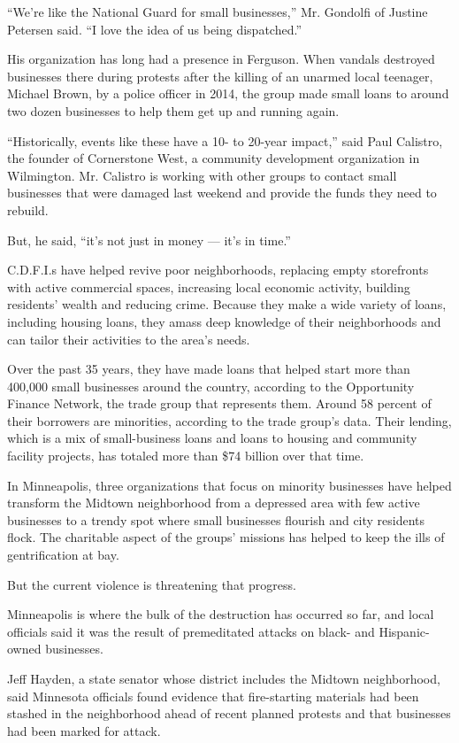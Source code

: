 ``We're like the National Guard for small businesses,'' Mr. Gondolfi of
Justine Petersen said. ``I love the idea of us being dispatched.''

His organization has long had a presence in Ferguson. When vandals
destroyed businesses there during protests after the killing of an
unarmed local teenager, Michael Brown, by a police officer in 2014, the
group made small loans to around two dozen businesses to help them get
up and running again.

``Historically, events like these have a 10- to 20-year impact,'' said
Paul Calistro, the founder of Cornerstone West, a community development
organization in Wilmington. Mr. Calistro is working with other groups to
contact small businesses that were damaged last weekend and provide the
funds they need to rebuild.

But, he said, ``it's not just in money --- it's in time.''

C.D.F.I.s have helped revive poor neighborhoods, replacing empty
storefronts with active commercial spaces, increasing local economic
activity, building residents' wealth and reducing crime. Because they
make a wide variety of loans, including housing loans, they amass deep
knowledge of their neighborhoods and can tailor their activities to the
area's needs.

Over the past 35 years, they have made loans that helped start more than
400,000 small businesses around the country, according to the
Opportunity Finance Network, the trade group that represents them.
Around 58 percent of their borrowers are minorities, according to the
trade group's data. Their lending, which is a mix of small-business
loans and loans to housing and community facility projects, has totaled
more than \$74 billion over that time.

In Minneapolis, three organizations that focus on minority businesses
have helped transform the Midtown neighborhood from a depressed area
with few active businesses to a trendy spot where small businesses
flourish and city residents flock. The charitable aspect of the groups'
missions has helped to keep the ills of gentrification at bay.

But the current violence is threatening that progress.

Minneapolis is where the bulk of the destruction has occurred so far,
and local officials said it was the result of premeditated attacks on
black- and Hispanic-owned businesses.

Jeff Hayden, a state senator whose district includes the Midtown
neighborhood, said Minnesota officials found evidence that fire-starting
materials had been stashed in the neighborhood ahead of recent planned
protests and that businesses had been marked for attack.

